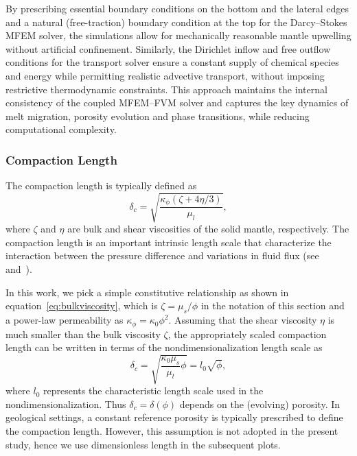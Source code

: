 By prescribing essential boundary conditions on the bottom and the lateral edges and a natural (free-traction) boundary condition at the top 
for the Darcy–Stokes MFEM solver, the simulations allow for mechanically reasonable mantle upwelling without artificial confinement.
Similarly, the Dirichlet inflow and free outflow conditions for the transport solver ensure a constant supply of chemical species 
and energy while permitting realistic advective transport, without imposing restrictive thermodynamic constraints.
This approach maintains the internal consistency of the coupled MFEM–FVM solver and captures the key dynamics of 
melt migration, porosity evolution and phase transitions, while reducing computational complexity.

\subsubsection{Compaction Length}
The compaction length is typically defined as
\begin{equation}
\delta_c = \sqrt{\frac{\kappa_\phi(\zeta + 4\eta/3)}{\mu_l}},
\end{equation}
where $\zeta$ and $\eta$ are bulk and shear viscosities of the solid mantle, respectively.
The compaction length is an important intrinsic length scale that characterize the interaction between the
pressure difference and variations in fluid flux (see~\cite{MagmaPhysics} and~\cite{flowindeformableporousp1}).

In this work, we pick a simple constitutive relationship as shown in equation~\eqref{eq:bulkviscosity},
which is $\zeta = \mu_s/\phi$ in the notation of this section
and a power-law permeability as $\kappa_\phi = \kappa_0 \phi^2$.
Assuming that the shear viscosity $\eta$ is much smaller than the bulk viscosity $\zeta$, 
the appropriately scaled compaction length can be written in terms of the nondimensionalization length scale 
as
\begin{equation}
\label{eq:scaledcompactionl}
\delta_c = \sqrt{\frac{\kappa_0 \mu_s}{\mu_l} \phi} = l_0 \sqrt{\phi},
\end{equation}
where $l_0$ represents the characteristic length scale used in the nondimensionalization.
Thus $\delta_c = \delta(\phi)$ depends on the (evolving) porosity. 
In geological settings, a constant reference porosity is typically prescribed to define the compaction length. 
However, this assumption is not adopted in the present study, hence we use dimensionless length in the 
subsequent plots.

